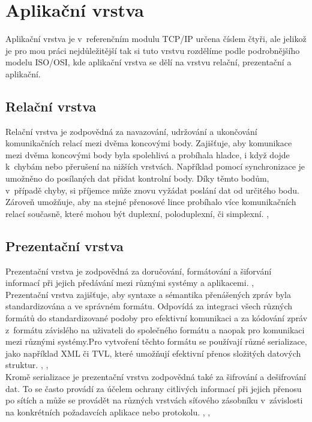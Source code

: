 \documentclass[12pt]{report}			%
\begin{document}
			\section{Aplikační  vrstva}
 Aplikační vrstva je v~referenčním modulu TCP/IP určena číslem čtyři, ale jelikož je pro mou práci nejdůležitější tak si tuto vrstvu rozdělíme podle podrobnějšího modelu ISO/OSI, kde aplikační vrstva se dělí na vrstvu relační, prezentační a aplikační. 
 
 
				\subsection{Relační vrstva}
Relační vrstva je zodpovědná za navazování, udržování a ukončování komunikačních relací mezi dvěma koncovými body. Zajišťuje, aby komunikace mezi dvěma koncovými body byla spolehlivá a probíhala hladce, i když dojde k~chybám nebo přerušení na nižších vrstvách. Například pomocí synchronizace je umožněno do posílaných dat přidat kontrolní body. Díky těmto bodům, v~případě chyby, si příjemce může znovu vyžádat poslání dat od určitého bodu. Zároveň umožňuje, aby na stejné přenosové lince probíhalo více komunikačních relací současně, které mohou být duplexní, poloduplexní, či simplexní. \cite{session1}, \cite{session2}


				\subsection{Prezentační vrstva}
Prezentační vrstva je zodpovědná za doručování, formátování a šiforvání informací při jejich předávání mezi různými systémy a aplikacemi. \cite{presentation1}, \cite{presentation2}
\\
Prezentační vrstva zajišťuje, aby syntaxe a sémantika přenášených zpráv byla standardizována a ve správném formátu. Odpovídá za integraci všech různých formátů do standardizované podoby pro efektivní komunikaci a za kódování zpráv z~formátu závislého na uživateli do společného formátu a naopak pro komunikaci mezi různými systémy.Pro vytvoření těchto formátu se používají různé serializace, jako například XML či TVL, které umožňují efektivní přenos složitých datových struktur. \cite{presentation1}, \cite{presentation2}, \cite{presentation3}
\\
Kromě serializace je prezentační vrstva zodpovědná také za šifrování a dešifrování dat. To se často provádí za účelem ochrany citlivých informací při jejich přenosu po sítích a může se provádět na různých vrstvách síťového zásobníku v~závislosti na konkrétních požadavcích aplikace nebo protokolu. \cite{presentation1}, \cite{presentation2}, \cite{presentation3}
\end{document}
